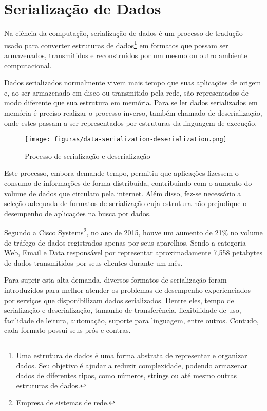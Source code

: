 \section[Serialização de Dados]{Serialização de Dados}

Na ciência da computação, serialização de dados é um processo de tradução usado para converter estruturas de dados\footnote{
  Uma estrutura de dados é uma forma abstrata de representar e organizar dados. Seu objetivo é ajudar a reduzir complexidade, podendo armazenar dados de diferentes tipos, como números, strings ou até mesmo outras estruturas de dados.
} em formatos que possam ser armazenados, transmitidos e reconstruídos por um mesmo ou outro ambiente computacional. \cite{Cline2016}

Dados serializados normalmente vivem mais tempo que suas aplicações de origem e, ao ser armazenado em disco ou transmitido pela rede, são representados de modo diferente que sua estrutura em memória. Para se ler dados serializados em memória é preciso realizar o processo inverso, também chamado de deserialização, onde estes passam a ser representados por estruturas da linguagem de execução. \cite{Guller2016}

\begin{figure}[H]
  \centering
  \texttt{[image: figuras/data-serialization-deserialization.png]}
  \caption{Processo de serialização e deserialização}
\end{figure}

Este processo, embora demande tempo, permitiu que aplicações fizessem o consumo de informações de forma distribuída, contribuindo com o aumento do volume de dados que circulam pela internet. Além disso, fez-se necessário a seleção adequada de formatos de serialização cuja estrutura não prejudique o desempenho de aplicações na busca por dados. \cite{SumarayMakki2012}

Segundo a Cisco Systems\footnote{
  Empresa de sistemas de rede.
}, no ano de 2015, houve um aumento de 21\% no volume de tráfego de dados registrados apenas por seus aparelhos. Sendo a categoria Web, Email e Data responsável por representar aproximadamente 7,558 petabytes de dados transmitidos por seus clientes durante um mês. \cite{Cisco2016}

Para suprir esta alta demanda, diversos formatos de serialização foram introduzidos para melhor atender os problemas de desempenho experienciados por serviços que disponibilizam dados serializados. Dentre eles, tempo de serialização e deserialização, tamanho de transferência, flexibilidade de uso, facilidade de leitura, automação, suporte para linguagem, entre outros. Contudo, cada formato possui seus prós e contras. \cite{Guller2016}

